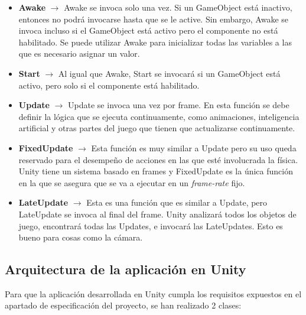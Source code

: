 \begin {itemize}
\item \textbf{Awake} $\rightarrow$  Awake se invoca solo una vez. Si un GameObject est\'a inactivo, entonces no podr\'a invocarse hasta que se le active. Sin embargo, Awake se invoca incluso si el GameObject est\'a activo pero el componente no est\'a habilitado. Se puede utilizar Awake para inicializar todas las variables a las que es necesario asignar un valor.
\item \textbf{Start} $\rightarrow$ Al igual que Awake, Start se invocar\'a si un GameObject est\'a activo, pero solo si el componente est\'a habilitado.
\item \textbf{Update} $\rightarrow$ Update se invoca una vez por frame. En esta funci\'on se debe definir la l\'ogica que se ejecuta continuamente, como animaciones, inteligencia artificial y otras partes del juego que tienen que actualizarse continuamente.
\item \textbf{FixedUpdate} $\rightarrow$ Esta funci\'on es muy similar a Update pero su uso queda reservado para el desempe\~no de acciones en las que est\'e involucrada la f\'isica. Unity tiene un sistema basado en frames y FixedUpdate es la \'unica funci\'on en la que se asegura que se va a ejecutar en un \textit{frame-rate} fijo. 
\item \textbf{LateUpdate} $\rightarrow$ Esta es una funci\'on que es similar a Update, pero LateUpdate se invoca al final del frame. Unity analizar\'a todos los objetos de juego, encontrar\'a todas las Updates, e invocar\'a las LateUpdates. Esto es bueno para cosas como la c\'amara.
\end {itemize}

\subsection {Arquitectura de la aplicaci\'on en Unity}

Para que la aplicaci\'on desarrollada en Unity cumpla los requisitos expuestos en el apartado de especificaci\'on del proyecto, se han realizado 2 clases:


